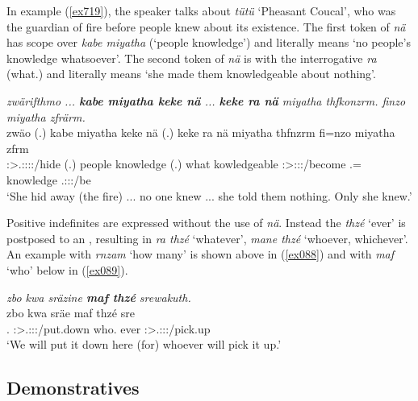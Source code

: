 In example (\ref{ex719}), the speaker talks about \emph{tütü} `Pheasant Coucal', who was the guardian of fire before people knew about its existence. The first token of \emph{nä} has scope over \emph{kabe miyatha} (`people knowledge') and literally means `no people's knowledge whatsoever'. The second token of \emph{nä} is with the interrogative \emph{ra} (what.\Abs{}) and literally means `she made them knowledgeable about nothing'.

\begin{exe}
	\ex \emph{zwärifthmo ... \textbf{kabe miyatha keke nä} ... \textbf{keke ra nä} miyatha thfkonzrm. finzo miyatha zfrärm.}\\
	\gll zwäo (.) kabe miyatha keke nä (.) keke ra nä miyatha thfnzrm fi=nzo miyatha zfrm\\
	\Tsg:\Sbj>\Tsg.\F:\Obj:\Rpst:\Pfv:\Andat/hide (.) people knowledge \Neg{} \Indf{} (.) \Neg{} what \Indf{} kowledgeable \Tsg:\Sbj>\Stpl:\Obj:\Pst:\Dur/become \Third.\Abs=\Only{} knowledge \Tsg.\F:\Sbj:\Pst:\Dur/be\\
	\trans `She hid away (the fire) ... no one knew ... she told them nothing. Only she knew.' 
	\label{ex719}
\end{exe}

Positive indefinites are expressed without the use of \emph{nä}. Instead the  \emph{thzé} `ever' is postposed to an , resulting in \emph{ra thzé} `whatever', \emph{mane thzé} `whoever, whichever'. An example with \emph{rnzam} `how many' is shown above in (\ref{ex088}) and with \emph{maf} `who' below in (\ref{ex089}).

\begin{exe}
	\ex \emph{zbo kwa sräzine \textbf{maf thzé} srewakuth.}\\
	\gll zbo kwa sräe maf thzé sre\\
	\Prox{}.\All{} \Fut{} \Fpl{}:\Sbj>\Tsg{}.\Masc{}:\Obj{}:\Irr{}:\Pfv{}/put.down who.\Erg{} ever \Stsg{}:\Sbj{}>\Tsg{}.\Masc{}:\Obj{}:\Irr{}:\Pfv{}/pick.up\\
	\trans `We will put it down here (for) whoever will pick it up.'\\ 
	\label{ex089}
\end{exe}%

\subsection{Demonstratives} \label{demonstratives}

